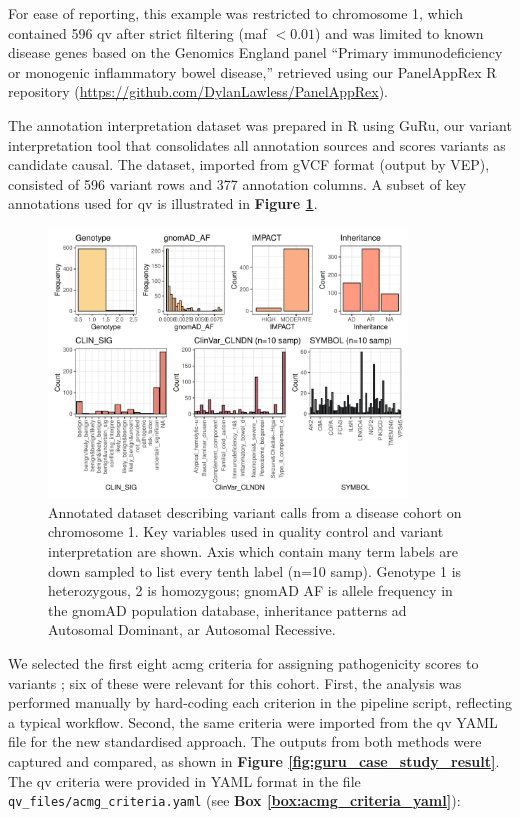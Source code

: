 For ease of reporting, this example was restricted to chromosome 1, which contained 596 \ac{qv} after strict filtering (\ac{maf} $< 0.01$) and was limited to known disease genes based on the Genomics England panel ``Primary immunodeficiency or monogenic inflammatory bowel disease,'' retrieved using our PanelAppRex R repository (\url{https://github.com/DylanLawless/PanelAppRex}).

The annotation interpretation dataset was prepared in R using GuRu, our variant interpretation tool that consolidates all annotation sources and scores variants as candidate causal. The dataset, imported from gVCF format (output by VEP), consisted of 596 variant rows and 377 annotation columns. A subset of key annotations used for \ac{qv} is illustrated in \textbf{Figure \ref{fig:guru_case_study_setup}}.

\begin{figure}[!h]
    \centering
   \includegraphics[width=0.85\textwidth]{./images/Guru_singlecase_distribution_variables.pdf}
       \caption{Annotated dataset describing variant calls from a disease cohort on chromosome 1. Key variables used in quality control and variant interpretation are shown. Axis which contain many term labels are down sampled to list every tenth  label (n=10 samp). Genotype 1 is heterozygous, 2 is homozygous; gnomAD AF is allele frequency in the gnomAD population database, inheritance patterns \ac{ad} Autosomal Dominant, \ac{ar} Autosomal Recessive.}
    \label{fig:guru_case_study_setup}
\end{figure}
\FloatBarrier

We selected the first eight \ac{acmg} criteria for assigning pathogenicity scores to variants \cite{richards2015standards}; six of these were relevant for this cohort. First, the analysis was performed manually by hard-coding each criterion in the pipeline script, reflecting a typical workflow. Second, the same criteria were imported from the \ac{qv} YAML file for the new standardised approach. The outputs from both methods were captured and compared, as shown in \textbf{Figure \ref{fig:guru_case_study_result}}. The \ac{qv} criteria were provided in YAML format in the file \texttt{qv\_files/acmg\_criteria.yaml} (see \textbf{Box \ref{box:acmg_criteria_yaml}}):

